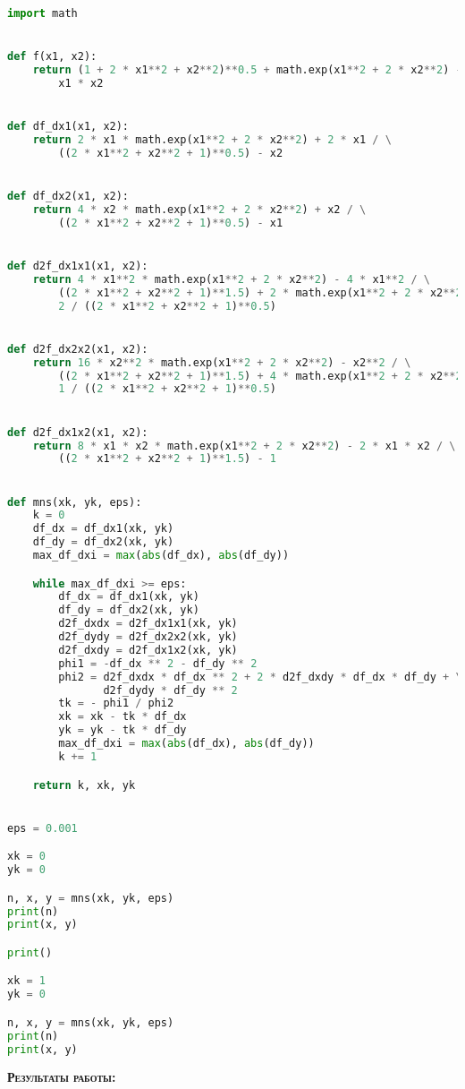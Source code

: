 \documentclass [12pt]{article}
\begin{document}
\begin{lstlisting}[language=python]
import math


def f(x1, x2):
    return (1 + 2 * x1**2 + x2**2)**0.5 + math.exp(x1**2 + 2 * x2**2) - \
        x1 * x2


def df_dx1(x1, x2):
    return 2 * x1 * math.exp(x1**2 + 2 * x2**2) + 2 * x1 / \
        ((2 * x1**2 + x2**2 + 1)**0.5) - x2


def df_dx2(x1, x2):
    return 4 * x2 * math.exp(x1**2 + 2 * x2**2) + x2 / \
        ((2 * x1**2 + x2**2 + 1)**0.5) - x1


def d2f_dx1x1(x1, x2):
    return 4 * x1**2 * math.exp(x1**2 + 2 * x2**2) - 4 * x1**2 / \
        ((2 * x1**2 + x2**2 + 1)**1.5) + 2 * math.exp(x1**2 + 2 * x2**2) + \
        2 / ((2 * x1**2 + x2**2 + 1)**0.5)


def d2f_dx2x2(x1, x2):
    return 16 * x2**2 * math.exp(x1**2 + 2 * x2**2) - x2**2 / \
        ((2 * x1**2 + x2**2 + 1)**1.5) + 4 * math.exp(x1**2 + 2 * x2**2) + \
        1 / ((2 * x1**2 + x2**2 + 1)**0.5)


def d2f_dx1x2(x1, x2):
    return 8 * x1 * x2 * math.exp(x1**2 + 2 * x2**2) - 2 * x1 * x2 / \
        ((2 * x1**2 + x2**2 + 1)**1.5) - 1


def mns(xk, yk, eps):
    k = 0
    df_dx = df_dx1(xk, yk)
    df_dy = df_dx2(xk, yk)
    max_df_dxi = max(abs(df_dx), abs(df_dy))

    while max_df_dxi >= eps:
        df_dx = df_dx1(xk, yk)
        df_dy = df_dx2(xk, yk)
        d2f_dxdx = d2f_dx1x1(xk, yk)
        d2f_dydy = d2f_dx2x2(xk, yk)
        d2f_dxdy = d2f_dx1x2(xk, yk)
        phi1 = -df_dx ** 2 - df_dy ** 2
        phi2 = d2f_dxdx * df_dx ** 2 + 2 * d2f_dxdy * df_dx * df_dy + \
               d2f_dydy * df_dy ** 2
        tk = - phi1 / phi2
        xk = xk - tk * df_dx
        yk = yk - tk * df_dy
        max_df_dxi = max(abs(df_dx), abs(df_dy))
        k += 1

    return k, xk, yk


eps = 0.001

xk = 0
yk = 0

n, x, y = mns(xk, yk, eps)
print(n)
print(x, y)

print()

xk = 1
yk = 0

n, x, y = mns(xk, yk, eps)
print(n)
print(x, y)

\end{lstlisting}


\textsc{\textbf{Результаты работы:}}
\end{document}
